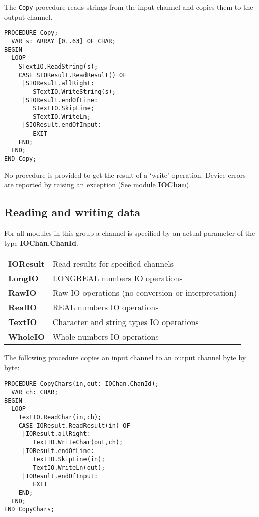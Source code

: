 The {\tt Copy} procedure reads strings from the input channel and
copies them to the output channel.
\begin{verbatim}
PROCEDURE Copy;
  VAR s: ARRAY [0..63] OF CHAR;
BEGIN
  LOOP
    STextIO.ReadString(s);
    CASE SIOResult.ReadResult() OF
     |SIOResult.allRight:
        STextIO.WriteString(s);
     |SIOResult.endOfLine:
        STextIO.SkipLine;
        STextIO.WriteLn;
     |SIOResult.endOfInput:
        EXIT
    END;
  END;
END Copy;
\end{verbatim}

\noindent
No procedure is provided to get the result of a `write'
operation. Device errors are reported by raising an exception
(See module {\bf IOChan}).

\subsection{Reading and writing data}\label{lib:ISO:chanio}

For all modules in this group a channel is specified by an actual
parameter of the type {\bf IOChan.ChanId}.
\begin{flushleft}
\begin{tabular}{ll}
\bf IOResult &   Read results for specified channels                     \\
\bf LongIO &     LONGREAL numbers IO operations                         \\
\bf RawIO &      Raw IO operations (no conversion or interpretation)     \\
\bf RealIO &     REAL numbers IO operations                             \\
\bf TextIO &     Character and string types IO operations                \\
\bf WholeIO &    Whole numbers IO operations                            \\
\end{tabular}
\end{flushleft}

\noindent
The following procedure copies an input channel to an output channel
byte by byte:
\begin{verbatim}
PROCEDURE CopyChars(in,out: IOChan.ChanId);
  VAR ch: CHAR;
BEGIN
  LOOP
    TextIO.ReadChar(in,ch);
    CASE IOResult.ReadResult(in) OF
     |IOResult.allRight:
        TextIO.WriteChar(out,ch);
     |IOResult.endOfLine:
        TextIO.SkipLine(in);
        TextIO.WriteLn(out);
     |IOResult.endOfInput:
        EXIT
    END;
  END;
END CopyChars;
\end{verbatim}

